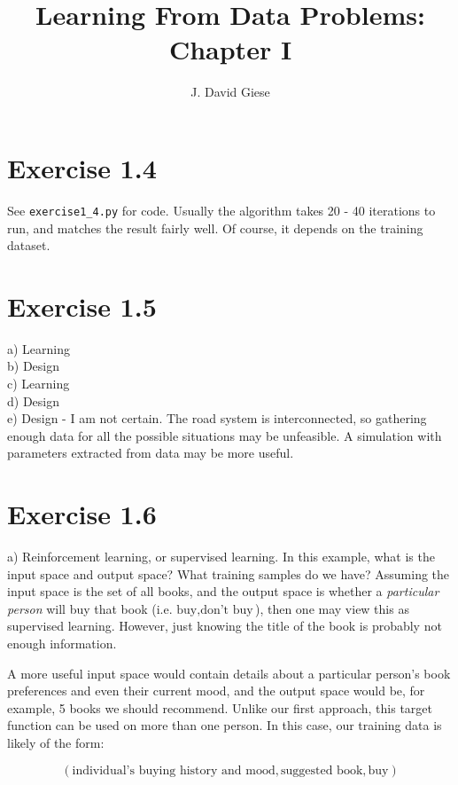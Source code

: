 \documentclass[11pt,letterpaper]{article}
\title{Learning From Data Problems: Chapter I}
\date{}
\author{J. David Giese}
\begin{document}
\maketitle
\section*{Exercise 1.4}
See \texttt{exercise1\_4.py} for code.  Usually the algorithm takes 20 - 40 iterations to run, and matches the result fairly well.  Of course, it depends on the training dataset.

\section*{Exercise 1.5}
a) Learning \\
b) Design \\
c) Learning \\
d) Design \\
e) Design - I am not certain.  The road system is interconnected, so gathering enough data for all the possible situations may be unfeasible.  A simulation with parameters extracted from data may be more useful. \\

\section*{Exercise 1.6}
a) Reinforcement learning, or supervised learning.  In this example, what is the input space and output space?  What training samples do we have?  Assuming the input space is the set of all books, and the output space is whether a \emph{particular person} will buy that book (i.e. ${\textrm{buy}, \textrm{don't buy}}$), then one may view this as supervised learning.  However, just knowing the title of the book is probably not enough information.

A more useful input space would contain details about a particular person's book preferences and even their current mood, and the output space would be, for example, 5 books we should recommend.  Unlike our first approach, this target function can be used on more than one person.  In this case, our training data is likely of the form:

\begin{equation*}
    (\textrm{individual's buying history and mood}, \textrm{suggested book}, \textrm{buy})
\end{equation*}
\end{document}
